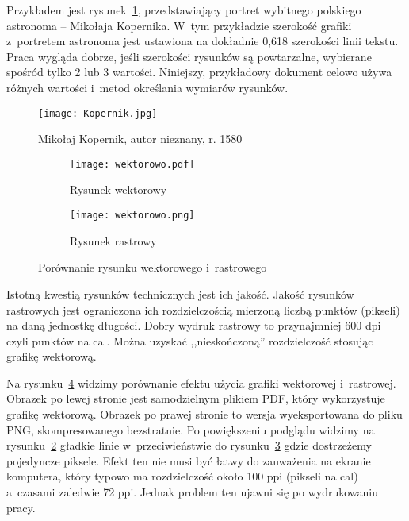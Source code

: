Przykładem jest rysunek~\ref{rys:kopernik}, przedstawiający portret wybitnego polskiego astronoma -- Mikołaja Kopernika. W~tym przykładzie szerokość grafiki z~portretem astronoma jest ustawiona na dokładnie 0,618 szerokości linii tekstu. Praca wygląda dobrze, jeśli szerokości rysunków są powtarzalne, wybierane spośród tylko 2 lub 3 wartości. Niniejszy, przykładowy dokument celowo używa różnych wartości i~metod określania wymiarów rysunków.

\begin{figure}[!hb]
    \centering \texttt{[image: Kopernik.jpg]} %
    \caption{Mikołaj Kopernik, autor nieznany, r. 1580}
    \label{rys:kopernik}
\end{figure}

\begin{figure}
    \centering
    \begin{subfigure}{.5\textwidth}
        \centering
        \texttt{[image: wektorowo.pdf]} %
        \caption{Rysunek wektorowy}
        \label{rys:wektorowopdf}
    \end{subfigure}%
    \begin{subfigure}{.5\textwidth}
        \centering
        \texttt{[image: wektorowo.png]}
        \caption{Rysunek rastrowy}
        \label{rys:wektorowopng}
    \end{subfigure}
    \caption{Porównanie rysunku wektorowego i~rastrowego}
    \label{rys:wektorowo}
\end{figure}

Istotną kwestią rysunków technicznych jest ich jakość. Jakość rysunków rastrowych jest ograniczona ich rozdzielczością mierzoną liczbą punktów (pikseli) na daną jednostkę długości. Dobry wydruk rastrowy to przynajmniej 600 dpi czyli punktów na cal. Można uzyskać ,,nieskończoną'' rozdzielczość stosując grafikę wektorową.

Na rysunku~\ref{rys:wektorowo} widzimy porównanie efektu użycia grafiki wektorowej i~rastrowej. Obrazek po lewej stronie jest samodzielnym plikiem PDF, który wykorzystuje grafikę wektorową. Obrazek po prawej stronie to wersja wyeksportowana do pliku PNG, skompresowanego bezstratnie. Po powiększeniu podglądu widzimy na rysunku~\ref{rys:wektorowopdf} gładkie linie w~przeciwieństwie do rysunku~\ref{rys:wektorowopng} gdzie dostrzeżemy pojedyncze piksele. Efekt ten nie musi być łatwy do zauważenia na ekranie komputera, który typowo ma rozdzielczość około 100 ppi (pikseli na cal) a~czasami zaledwie 72 ppi. Jednak problem ten ujawni się po wydrukowaniu pracy.

